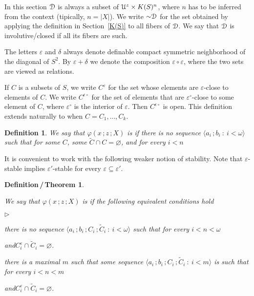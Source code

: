 \documentclass{amsproc}
\newcommand{\mylabel}[1]{{#1}\hfill}
\renewenvironment{itemize}
  {\begin{list}{$\triangleright$}{%
  \setlength{\parskip}{0mm}
  \setlength{\topsep}{.1\baselineskip}
  \setlength{\rightmargin}{0mm}
  \setlength{\listparindent}{0mm}
  \setlength{\itemindent}{0mm}
  \setlength{\labelwidth}{3ex}
  \setlength{\itemsep}{.1\baselineskip}
  \setlength{\parsep}{.1\baselineskip}
  \setlength{\partopsep}{0mm}
  \setlength{\labelsep}{1ex}
  \setlength{\leftmargin}{\labelwidth+\labelsep}
  \let\makelabel\mylabel}}{%
\end{list}}
\newcounter{thm}
\theoremstyle{mio}
\newtheorem{definition}[thm]{Definition}\tcolorboxenvironment{definition}{mythm}
\newtheorem{definition_theorem}[thm]{Definition\,/\,Theorem}\tcolorboxenvironment{definition_theorem}{mythm}
\renewcommand*{\emph}[1]{%
   \smash{\tikz[baseline]\node[rectangle, fill=teal!25, rounded corners, inner xsep=0.5ex, inner ysep=0.2ex, anchor=base, minimum height = 2.7ex]{\strut #1};}}
\begin{document}
In this section  ${\EuScript D}$ is always a subset of ${\EuScript U}^z\times K(S)^n$, where $n$ has to be inferred from the context (tipically, $n=|X|$).
We write ${\sim}{\EuScript D}$ for the set obtained by applying the definition in Section~\ref{K(S)} to all fibers of ${\EuScript D}$.
We say that ${\EuScript D}$ is involutive/closed if all its fibers are such.

The letters $\varepsilon$ and $\delta$ always denote definable compact symmetric neighborhood of the diagonal of $S^2$.
By $\varepsilon+\delta$ we denote the composition $\varepsilon\circ\varepsilon$, where the two sets are viewed as relations.

If $C$ is a subsets of $S$, we write $C^\varepsilon$ for the set whose elements are $\varepsilon$-close to elements of $C$.
We write $C^{\epsilon\circ}$ for the set of elements that are $\varepsilon\!^\circ$-close to some  element of $C$, where $\varepsilon\!^\circ$ is the interior of $\varepsilon$.
Then $C^{\epsilon\circ}$ is open.
This definition extends naturally to when $C=C_1,\dots,C_k$.

\begin{definition}\strut
  We say that $\varphi(x\,;z\,;X)$ is \emph{stable\/} if there is no sequence $\langle a_i\,;b_i\ :\ i<\omega\rangle$ such that for some $C$, some $\tilde C\cap C=\varnothing$, and for every $i<n$\smallskip

    \smallskip

\end{definition}

It is convenient to work with the following weaker notion of stability. Note that $\varepsilon$-stable implies $\varepsilon'$-stable for every $\varepsilon\subseteq\varepsilon'$.


\begin{definition_theorem}\label{defthm_epsilon_stable}\strut
  We say that $\varphi(x\,;z\,;X)$ is \emph{$\varepsilon$-stable\/} if the following equivalent conditions hold\smallskip
  
  \begin{itemize}
    \item [1.]  there is no sequence $\langle a_i\,;b_i\,;C_i\,;\tilde C_i\ :\ i<\omega\rangle$ such that for every $i<n<\omega$\smallskip
  
    \quad and\quad $C_i^\varepsilon\cap\tilde C_i=\varnothing$.\smallskip

    \item [2.]  there is a maximal $m$ such that some sequence $\langle a_i\,;b_i\,;C_i\,;\tilde C_i\ :\ i<m\rangle$ is such that for every $i<n<m$

    \quad and\quad $C_i^\varepsilon\cap\tilde C_i=\varnothing$.\smallskip
  \end{itemize}
\end{definition_theorem}
\end{document}
